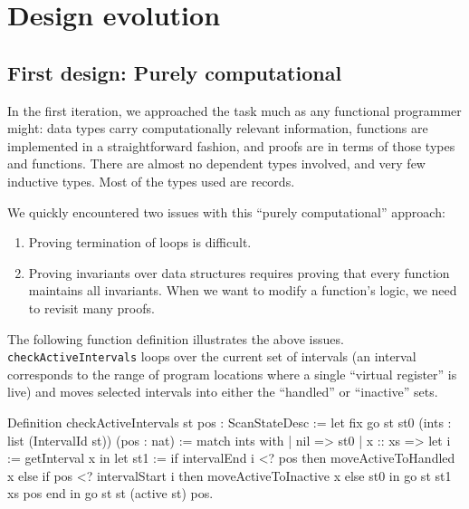 \documentclass{llncs}
\begin{document}
\section{Design evolution}
\label{sec:evolve}

\subsection{First design: Purely computational}
\label{sec:compdesign}

In the first iteration, we approached the task much as any functional
programmer might: data types carry computationally relevant
information, functions are implemented in a straightforward fashion,
and proofs are in terms of those types and functions.  There are
almost no dependent types involved, and very few inductive types.
Most of the types used are records.


We quickly encountered two issues with this ``purely computational''
approach:
\begin{enumerate}
\item Proving termination of loops is difficult.
\item Proving invariants over data structures requires proving that
  every function maintains all invariants. When we want to modify a
  function's logic, we need to revisit many proofs.
\end{enumerate}
The following function definition illustrates the above
issues. \texttt{checkActiveIntervals} loops over the current set of
intervals (an interval corresponds to the range of program locations
where a single ``virtual register'' is live) and moves selected
intervals into either the ``handled'' or ``inactive'' sets.

\begin{coq_example*}
Definition checkActiveIntervals st pos : ScanStateDesc :=
  let fix go st st0 (ints : list (IntervalId st))
             (pos : nat) :=
    match ints with
    | nil => st0
    | x :: xs =>
        let i := getInterval x in
        let st1 := if intervalEnd i <? pos
                   then moveActiveToHandled x
                   else if pos <? intervalStart i
                        then moveActiveToInactive x
                        else st0 in
        go st st1 xs pos
    end in
  go st st (active st) pos.
\end{coq_example*}
\end{document}
